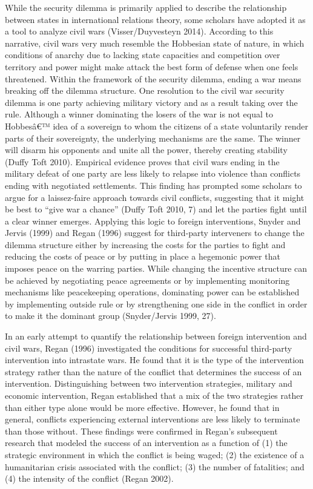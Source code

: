 \documentclass[]{article}
\newcommand{\euro}{€}
\begin{document}
While the security dilemma is primarily applied to describe the
relationship between states in international relations theory, some
scholars have adopted it as a tool to analyze civil wars
(Visser/Duyvesteyn 2014). According to this narrative, civil wars very
much resemble the Hobbesian state of nature, in which conditions of
anarchy due to lacking state capacities and competition over territory
and power might make attack the best form of defense when one feels
threatened. Within the framework of the security dilemma, ending a war
means breaking off the dilemma structure. One resolution to the civil
war security dilemma is one party achieving military victory and as a
result taking over the rule. Although a winner dominating the losers of
the war is not equal to Hobbesâ\euro{}™ idea of a sovereign to whom the
citizens of a state voluntarily render parts of their sovereignty, the
underlying mechanisms are the same. The winner will disarm his opponents
and unite all the power, thereby creating stability (Duffy Toft 2010).
Empirical evidence proves that civil wars ending in the military defeat
of one party are less likely to relapse into violence than conflicts
ending with negotiated settlements. This finding has prompted some
scholars to argue for a laissez-faire approach towards civil conflicts,
suggesting that it might be best to ``give war a chance'' (Duffy Toft
2010, 7) and let the parties fight until a clear winner emerges.
Applying this logic to foreign interventions, Snyder and Jervis (1999)
and Regan (1996) suggest for third-party interveners to change the
dilemma structure either by increasing the costs for the parties to
fight and reducing the costs of peace or by putting in place a hegemonic
power that imposes peace on the warring parties. While changing the
incentive structure can be achieved by negotiating peace agreements or
by implementing monitoring mechanisms like peacekeeping operations,
dominating power can be established by implementing outside rule or by
strengthening one side in the conflict in order to make it the dominant
group (Snyder/Jervis 1999, 27).

In an early attempt to quantify the relationship between foreign
intervention and civil wars, Regan (1996) investigated the conditions
for successful third-party intervention into intrastate wars. He found
that it is the type of the intervention strategy rather than the nature
of the conflict that determines the success of an intervention.
Distinguishing between two intervention strategies, military and
economic intervention, Regan established that a mix of the two
strategies rather than either type alone would be more effective.
However, he found that in general, conflicts experiencing external
interventions are less likely to terminate than those without. These
findings were confirmed in Regan's subsequent research that modeled the
success of an intervention as a function of (1) the strategic
environment in which the conflict is being waged; (2) the existence of a
humanitarian crisis associated with the conflict; (3) the number of
fatalities; and (4) the intensity of the conflict (Regan 2002).
\end{document}
